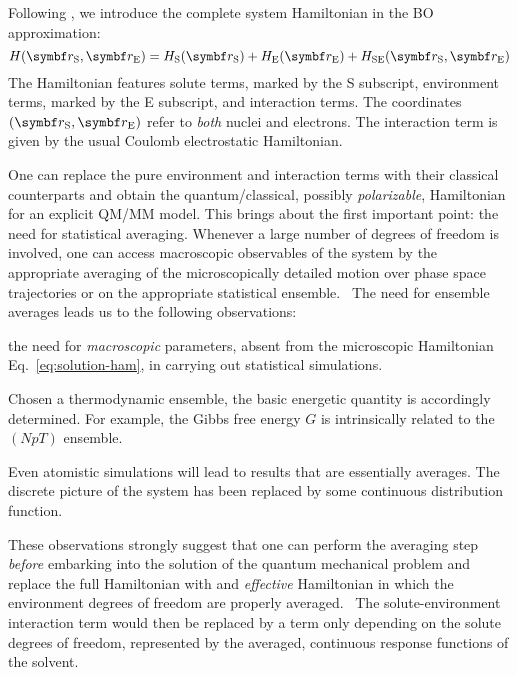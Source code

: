 Following \citeauthor{Tomasi2007-es}, we introduce the complete system
Hamiltonian in the \acrshort{BO} approximation:~\autocite{Tomasi2004-dc,
Tomasi2007-es}
\begin{equation}\label{eq:solution-ham}
 H(\vect{r}_\mathrm{S}, \vect{r}_\mathrm{E}) =
  H_\mathrm{S}(\vect{r}_\mathrm{S}) +  H_\mathrm{E}(\vect{r}_\mathrm{E})
+ H_\mathrm{SE}(\vect{r}_\mathrm{S}, \vect{r}_\mathrm{E})
\end{equation}
The Hamiltonian features solute terms, marked by the S subscript,
environment terms, marked by the E subscript, and interaction terms.
The coordinates $(\vect{r}_\mathrm{S}, \vect{r}_\mathrm{E})$ refer to
\emph{both} nuclei and electrons.
The interaction term is given by the usual Coulomb electrostatic
Hamiltonian.

One can replace the pure environment and interaction terms with their
classical counterparts and obtain the quantum/classical, possibly
\emph{polarizable}, Hamiltonian for an explicit \acrshort{QM}/\acrshort{MM} model.
This brings about the first important point: the need for statistical
averaging.
Whenever a large number of degrees of freedom is involved, one can
access macroscopic observables of the system by the appropriate
averaging of the microscopically detailed motion over phase space
trajectories or on the appropriate statistical
ensemble.~\autocite{Hill1960-ql}
The need for ensemble averages leads us to the following observations:
\begin{enumerate*}[label={\alph*)},font={\color{PMS1797}}]
 \item
   the need for \emph{macroscopic} parameters, absent from the
   microscopic Hamiltonian Eq.~\eqref{eq:solution-ham}, in carrying out
   statistical simulations.
 \item
   Chosen a thermodynamic ensemble, the basic energetic quantity is
   accordingly determined. For example, the Gibbs free energy  $G$ is
   intrinsically related to the $(NpT)$ ensemble.
 \item
   Even atomistic simulations will lead to results that are essentially
   averages. The discrete picture of the system has been replaced by
   some continuous distribution function.
\end{enumerate*}

These observations strongly suggest that one can perform the averaging
step \emph{before} embarking into the solution of the quantum mechanical
problem and replace the full Hamiltonian with and \emph{effective}
Hamiltonian in which the environment degrees of freedom are properly
averaged.~\autocite{Angyan1992-vo, Tapia1992-pu}
The solute-environment interaction term would then be replaced by
a term only depending on the solute degrees of freedom, represented by
the averaged, continuous response functions of the solvent.

